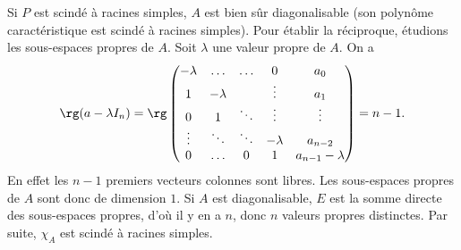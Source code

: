 \documentclass[fontsize=12pt,twoside=false,parskip=half]{scrartcl}
\begin{document}
      Si $P$ est scindé à racines simples, $A$ est bien sûr diagonalisable (son polynôme caractéristique est scindé à 
      racines simples). Pour établir la réciproque, étudions les sous-espaces propres de $A$. Soit $\lambda$ une valeur
      propre de $A$. On a
      \[
         \rg(a - \lambda I_n) = \rg       
            \begin{pmatrix}
              -\lambda & \ldots   & \ldots & 0        & a_0\\
               1       & -\lambda &        & \vdots   & a_1\\
               0       & 1        & \ddots & \vdots   & \vdots\\
               \vdots  & \ddots   & \ddots & -\lambda & a_{n - 2}\\
               0       & \ldots   & 0      & 1        & a_{n - 1} -\lambda 
            \end{pmatrix} = n - 1.
      \]
      En effet les $n - 1$ premiers vecteurs colonnes sont libres. Les sous-espaces propres de $A$ sont donc de 
      dimension $1$. Si $A$ est diagonalisable, $E$ est la somme directe des sous-espaces propres, d’où il y en
      a $n$, donc $n$ valeurs propres distinctes. Par suite, $\chi_A$ est scindé à racines simples.
\end{document}
